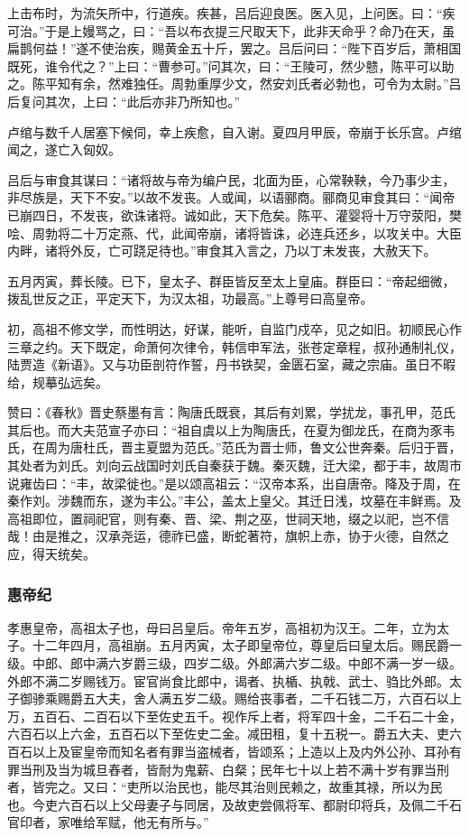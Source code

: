 \documentclass[]{article}
\begin{document}
上击布时，为流矢所中，行道疾。疾甚，吕后迎良医。医入见，上问医。曰：``疾可治。''于是上嫚骂之，曰：``吾以布衣提三尺取天下，此非天命乎？命乃在天，虽扁鹊何益！''遂不使治疾，赐黄金五十斤，罢之。吕后问曰：``陛下百岁后，萧相国既死，谁令代之？''上曰：``曹参可。''问其次，曰：``王陵可，然少戆，陈平可以助之。陈平知有余，然难独任。周勃重厚少文，然安刘氏者必勃也，可令为太尉。''吕后复问其次，上曰：``此后亦非乃所知也。''

卢绾与数千人居塞下候伺，幸上疾愈，自入谢。夏四月甲辰，帝崩于长乐宫。卢绾闻之，遂亡入匈奴。

吕后与审食其谋曰：``诸将故与帝为编户民，北面为臣，心常鞅鞅，今乃事少主，非尽族是，天下不安。''以故不发丧。人或闻，以语郦商。郦商见审食其曰：``闻帝已崩四日，不发丧，欲诛诸将。诚如此，天下危矣。陈平、灌婴将十万守荥阳，樊哙、周勃将二十万定燕、代，此闻帝崩，诸将皆诛，必连兵还乡，以攻关中。大臣内畔，诸将外反，亡可跷足待也。''审食其入言之，乃以丁未发丧，大赦天下。

五月丙寅，葬长陵。已下，皇太子、群臣皆反至太上皇庙。群臣曰：``帝起细微，拨乱世反之正，平定天下，为汉太祖，功最高。''上尊号曰高皇帝。

初，高祖不修文学，而性明达，好谋，能听，自监门戍卒，见之如旧。初顺民心作三章之约。天下既定，命萧何次律令，韩信申军法，张苍定章程，叔孙通制礼仪，陆贾造《新语》。又与功臣剖符作誓，丹书铁契，金匮石室，藏之宗庙。虽日不暇给，规摹弘远矣。

赞曰：《春秋》晋史蔡墨有言：陶唐氏既衰，其后有刘累，学扰龙，事孔甲，范氏其后也。而大夫范宣子亦曰：``祖自虞以上为陶唐氏，在夏为御龙氏，在商为豕韦氏，在周为唐杜氏，晋主夏盟为范氏。''范氏为晋士师，鲁文公世奔秦。后归于晋，其处者为刘氏。刘向云战国时刘氏自秦获于魏。秦灭魏，迁大梁，都于丰，故周市说雍齿曰：``丰，故梁徙也。''是以颂高祖云：``汉帝本系，出自唐帝。降及于周，在秦作刘。涉魏而东，遂为丰公。''丰公，盖太上皇父。其迁日浅，坟墓在丰鲜焉。及高祖即位，置祠祀官，则有秦、晋、梁、荆之巫，世祠天地，缀之以祀，岂不信哉！由是推之，汉承尧运，德祚已盛，断蛇著符，旗帜上赤，协于火德，自然之应，得天统矣。

\hypertarget{header-n154}{%
\subsubsection{惠帝纪}\label{header-n154}}

孝惠皇帝，高祖太子也，母曰吕皇后。帝年五岁，高祖初为汉王。二年，立为太子。十二年四月，高祖崩。五月丙寅，太子即皇帝位，尊皇后曰皇太后。赐民爵一级。中郎、郎中满六岁爵三级，四岁二级。外郎满六岁二级。中郎不满一岁一级。外郎不满二岁赐钱万。宦官尚食比郎中，谒者、执楯、执戟、武士、驺比外郎。太子御骖乘赐爵五大夫，舍人满五岁二级。赐给丧事者，二千石钱二万，六百石以上万，五百石、二百石以下至佐史五千。视作斥上者，将军四十金，二千石二十金，六百石以上六金，五百石以下至佐史二金。减田租，复十五税一。爵五大夫、吏六百石以上及宦皇帝而知名者有罪当盗械者，皆颂系；上造以上及内外公孙、耳孙有罪当刑及当为城旦舂者，皆耐为鬼薪、白粲；民年七十以上若不满十岁有罪当刑者，皆完之。又曰：``吏所以治民也，能尽其治则民赖之，故重其禄，所以为民也。今吏六百石以上父母妻子与同居，及故吏尝佩将军、都尉印将兵，及佩二千石官印者，家唯给军赋，他无有所与。''
\end{document}

